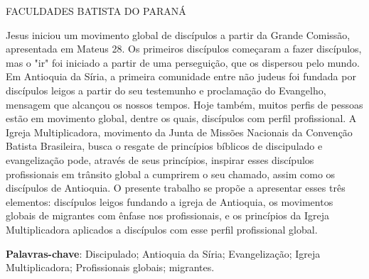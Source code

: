 \documentclass[12pt,openright,oneside,a4paper,
english,french,spanish,brazil]{abntex2}
\renewcommand{\imprimircapa}{%
  \begin{capa}%
    \center
    \ABNTEXchapterfont\Large FACULDADES BATISTA DO PARANÁ

    \vspace*{5,5cm}
    \MakeUppercase{{\ABNTEXchapterfont\large\imprimirautor}}
    \vfill
    \begin{center}
	\MakeUppercase{\ABNTEXchapterfont\bfseries\large\imprimirtitulo}
    \end{center}
    \vfill
    \large\imprimirlocal

    \large\imprimirdata
    \vspace*{1cm}
  \end{capa}
}
\begin{document}
 

\imprimircapa 
\imprimirfolhaderosto 

\begin{resumo} 
	Jesus iniciou um movimento global de discípulos a partir da Grande Comissão, apresentada em Mateus 28. Os primeiros discípulos começaram a fazer discípulos, mas o "ir" foi iniciado a partir de uma perseguição, que os dispersou pelo mundo. Em Antioquia da Síria, a primeira comunidade entre não judeus foi fundada por discípulos leigos a partir do seu testemunho e proclamação do Evangelho, mensagem que alcançou os nossos tempos. Hoje também, muitos perfis de pessoas estão em movimento global, dentre os quais, discípulos com perfil profissional. A Igreja Multiplicadora, movimento da Junta de Missões Nacionais da Convenção Batista Brasileira, busca o resgate de princípios bíblicos de discipulado e evangelização pode, através de seus princípios, inspirar esses discípulos profissionais em trânsito global a cumprirem o seu chamado, assim como os discípulos de Antioquia. O presente trabalho se propõe a apresentar esses três elementos: discípulos leigos fundando a igreja de Antioquia, os movimentos globais de migrantes com ênfase nos profissionais, e os princípios da Igreja Multiplicadora aplicados a discípulos com esse perfil profissional global.
  
\vspace{\onelineskip} 
\noindent 
\textbf{Palavras-chave}: Discipulado; Antioquia da Síria; Evangelização; Igreja Multiplicadora; Profissionais globais; migrantes.
\end{resumo} 
\end{document}
